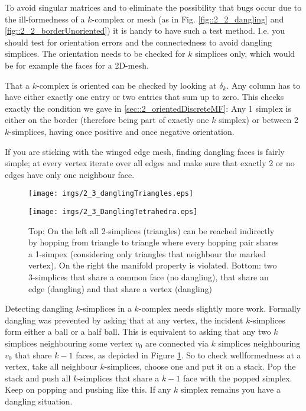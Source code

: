 To avoid singular matrices and to eliminate the possibility that bugs occur due to the ill-formedness of a $k$-complex or mesh (as in Fig. \ref{fig::2_2_dangling} and \ref{fig::2_2_borderUnoriented}) it is handy to have such a test method. I.e. you should test for orientation errors and the connectedness to avoid dangling simplices.
The orientation needs to be checked for $k$ simplices only, which would be for example the faces for a 2D-mesh. 

That a $k$-complex is oriented can be checked by looking at $\delta_k$. Any column has to have either exactly one entry or two entries that sum up to zero. This checks exactly the condition we gave in \ref{sec::2_orientedDiscreteMF}: Any 1 simplex is either on the border (therefore being part of exactly one $k$ simplex) or between 2 $k$-simplices, having once positive and once negative orientation.

If you are sticking with the winged edge mesh, finding dangling faces is fairly simple; at every vertex iterate over all edges and make sure that exactly 2 or no edges have only one neighbour face.
\begin{figure}
	\begin{center}
	\texttt{[image: imgs/2\_3\_danglingTriangles.eps]}
	\vspace{0.5cm}
	
	\texttt{[image: imgs/2\_3\_DanglingTetrahedra.eps]}
	\end{center}
	\caption{Top: On the left all 2-simplices (triangles) can be reached indirectly by hopping from triangle to triangle where every hopping pair shares a 1-simpex (considering only triangles that neighbour the marked vertex). On the right the manifold property is violated. Bottom: two 3-simplices that share a common face (no dangling), that share an edge (dangling) and that share a vertex (dangling)}
	\label{fig::2_3_dangling}
\end{figure}
Detecting dangling $k$-simplices in a $k$-complex needs slightly more work. Formally dangling was prevented by asking that at any vertex, the incident $k$-simplices form either a ball or a half ball. This is equivalent to asking that any two $k$ simplices neighbouring some vertex $v_0$ are connected via $k$ simplices neighbouring $v_0$ that share $k-1$ faces, as depicted in Figure \ref{fig::2_3_dangling}.  So to check wellformedness at a vertex, take all neighbour $k$-simplices, choose one and put it on a stack. Pop the stack and push all $k$-simplices that share a $k-1$ face with the popped simplex. Keep on popping and pushing like this. If any $k$ simplex remains you have a dangling situation. 
	
